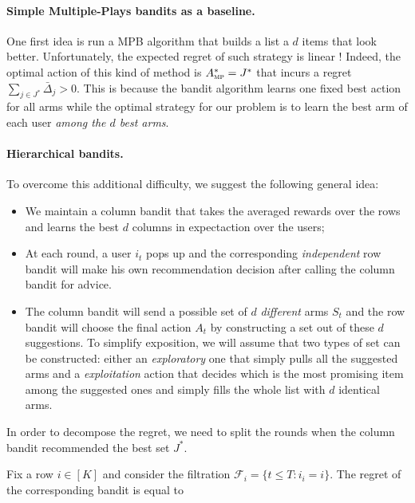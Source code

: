 \paragraph{Simple Multiple-Plays bandits as a baseline. } One first idea is run a
MPB algorithm that builds a list a $d$ items that look better.
Unfortunately, the expected regret of such strategy is linear ! Indeed, the optimal action of this kind of method is $A^*_{\textsc{mp}}= J^*$ that incurs a regret $\sum_{j\in J^*} \bar{\Delta}_j >0$.
This is because the bandit algorithm learns one fixed best action for all arms while the optimal
strategy for our problem is to learn the best arm of each user \emph{among the $d$ best arms}.

\paragraph{Hierarchical bandits. } To overcome this additional difficulty, we suggest the following general idea:
\begin{itemize}
\item We maintain a column bandit that takes the averaged rewards over the rows and learns the best $d$ columns in expectaction over the users;
\item At each round, a user $i_t$ pops up and the corresponding \emph{independent} row bandit will make
his own recommendation decision after calling the column bandit for advice.
\item The column bandit will send a possible set of $d$ \emph{different} arms $S_t$ and the row bandit will choose the final action $A_t$ by constructing a set out of these $d$ suggestions. To simplify exposition, we will assume that two types of set can be constructed: either an \emph{exploratory} one that simply pulls all the suggested arms and a \emph{exploitation} action that decides which is the most promising item among the suggested ones and simply fills the whole list with $d$ identical arms.
\end{itemize}

In order to decompose the regret, we need to split the rounds when the column bandit recommended the best set $J^*$.

Fix a row $i\in [K]$ and consider the filtration $\mathcal{F}_i=\{t\leq T: i_i=i \}$.
The regret of the corresponding bandit is equal to

